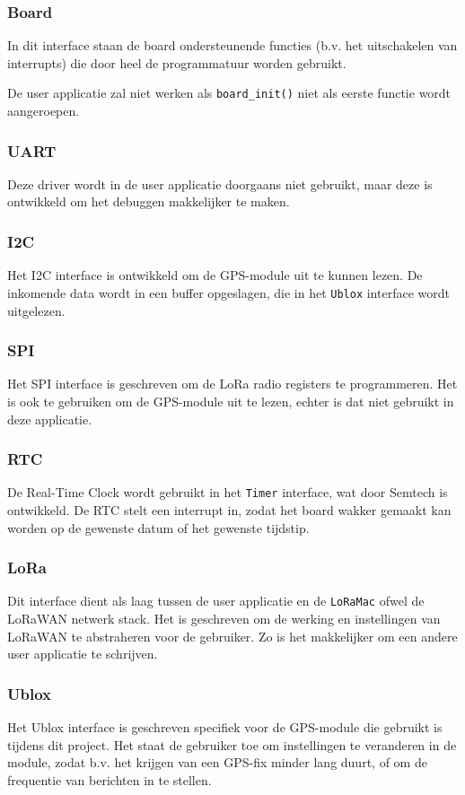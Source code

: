 \subsubsection{Board}
In dit interface staan de board ondersteunende functies (b.v. het uitschakelen van
interrupts) die door heel de programmatuur worden gebruikt.

De user applicatie zal niet werken als \texttt{board\_init()} niet als eerste
functie wordt aangeroepen.

\subsubsection{UART}
Deze driver wordt in de user applicatie doorgaans niet gebruikt, maar deze is
ontwikkeld om het debuggen makkelijker te maken.

\subsubsection{I2C}
Het I2C interface is ontwikkeld om de GPS-module uit te kunnen lezen. De inkomende
data wordt in een buffer opgeslagen, die in het \texttt{Ublox} interface wordt
uitgelezen.

\subsubsection{SPI}
Het SPI interface is geschreven om de LoRa radio registers te programmeren. Het
is ook te gebruiken om de GPS-module uit te lezen, echter is dat niet gebruikt in
deze applicatie.

\subsubsection{RTC}
De Real-Time Clock wordt gebruikt in het \texttt{Timer} interface, wat door Semtech
is ontwikkeld. De RTC stelt een interrupt in, zodat het board wakker gemaakt kan
worden op de gewenste datum of het gewenste tijdstip.

\subsubsection{LoRa}
Dit interface dient als laag tussen de user applicatie en de \texttt{LoRaMac} ofwel
de LoRaWAN netwerk stack. Het is geschreven om de werking en instellingen van LoRaWAN
te abstraheren voor de gebruiker. Zo is het makkelijker om een andere user applicatie
te schrijven.

\subsubsection{Ublox}
Het Ublox interface is geschreven specifiek voor de GPS-module die gebruikt is
tijdens dit project. Het staat de gebruiker toe om instellingen te veranderen in
de module, zodat b.v. het krijgen van een GPS-fix minder lang duurt, of om de
frequentie van berichten in te stellen.


